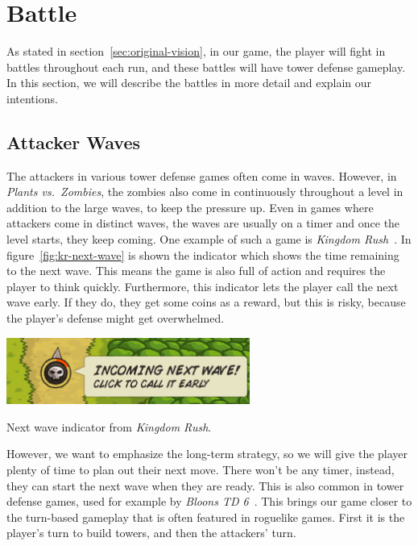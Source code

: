 \section{Battle}

As stated in section~\ref{sec:original-vision}, in our game, the player will fight in battles throughout each run, and these battles will have tower defense gameplay.
In this section, we will describe the battles in more detail and explain our intentions.

\subsection{Attacker Waves}\label{sec:design-attacker-waves}

The attackers in various tower defense games often come in waves.
However, in \emph{Plants vs.\ Zombies}, the zombies also come in continuously throughout a level in addition to the large waves, to keep the pressure up.
Even in games where attackers come in distinct waves, the waves are usually on a timer and once the level starts, they keep coming.
One example of such a game is \emph{Kingdom Rush}~\cite{kingdomRush}.
In figure~\ref{fig:kr-next-wave} is shown the indicator which shows the time remaining to the next wave.
This means the game is also full of action and requires the player to think quickly.
Furthermore, this indicator lets the player call the next wave early.
If they do, they get some coins as a reward, but this is risky, because the player's defense might get overwhelmed.

\begin{center}
    \captionsetup{type=figure}
    \includegraphics[width=0.6\textwidth]{img/Kingdom-Rush-Next-Wave-Detail.png}
    \caption{Next wave indicator from \emph{Kingdom Rush}.}
    \label{fig:kr-next-wave}
\end{center}

However, we want to emphasize the long-term strategy, so we will give the player plenty of time to plan out their next move.
There won't be any timer, instead, they can start the next wave when they are ready.
This is also common in tower defense games, used for example by \emph{Bloons TD 6}~\cite{BTD6}.
This brings our game closer to the turn-based gameplay that is often featured in roguelike games.
First it is the player's turn to build towers, and then the attackers' turn.

